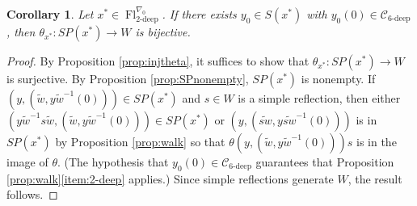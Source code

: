 \documentclass[oneside,a4paper,english, 11pt]{amsart}
\theoremstyle{plain}
\theoremstyle{plain}
\theoremstyle{plain}
\theoremstyle{plain}
\theoremstyle{plain}
\theoremstyle{plain}
\newtheorem{cor}[thm]{Corollary}
\theoremstyle{definition}
\theoremstyle{definition}
\theoremstyle{definition}
\theoremstyle{remark}
\numberwithin{equation}{section}
\newcommand{\cC}{\mathcal{C}}
\newcommand{\tld}[1]{\widetilde{#1}}
\DeclareMathOperator{\Fl}{Fl}
\newcommand{\ra}{\rightarrow}
\begin{document}
\begin{cor}\label{cor:surjtheta}
Let $x^* \in \Fl_{2\textrm{-deep}}^{\nabla_0}$. 
If there exists $y_0\in S(x^*)$ with $y_0(0) \in \cC_{6\textrm{-deep}}$, then $\theta_{x^*}: SP(x^*) \ra W$ is bijective.
\end{cor}
\begin{proof}
By Proposition \ref{prop:injtheta}, it suffices to show that $\theta_{x^*}: SP(x^*) \ra W$ is surjective. 
By Proposition \ref{prop:SPnonempty}, $SP(x^*)$ is nonempty. 
If $(y,(\tld{w},y\tld{w}^{-1}(0))) \in SP(x^*)$ and $s\in W$ is a simple reflection, then either $(y\tld{w}^{-1}s\tld{w},(\tld{w},y\tld{w}^{-1}(0))) \in SP(x^*)$ or $(y,(\tld{sw},y\tld{sw}^{-1}(0)))$ is in $SP(x^*)$ by Proposition \ref{prop:walk} so that $\theta(y,(\tld{w},y\tld{w}^{-1}(0))) s$ is in the image of $\theta$. 
(The hypothesis that $y_0(0)\in \cC_{6\textrm{-deep}}$ guarantees that Proposition \ref{prop:walk}\eqref{item:2-deep} applies.)
%
%
Since simple reflections generate $W$, the result follows.
\end{proof}
\end{document}
